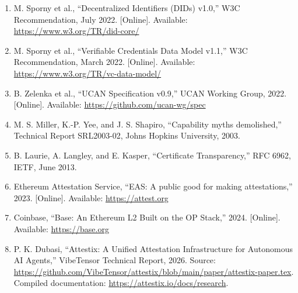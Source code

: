 \begin{enumerate}
\vspace{0.3cm}

\item M. Sporny et al., ``Decentralized Identifiers (DIDs) v1.0,'' W3C Recommendation, July 2022. [Online]. Available: \url{https://www.w3.org/TR/did-core/}

\vspace{0.3cm}

\item M. Sporny et al., ``Verifiable Credentials Data Model v1.1,'' W3C Recommendation, March 2022. [Online]. Available: \url{https://www.w3.org/TR/vc-data-model/}

\vspace{0.3cm}

\item B. Zelenka et al., ``UCAN Specification v0.9,'' UCAN Working Group, 2022. [Online]. Available: \url{https://github.com/ucan-wg/spec}

\vspace{0.3cm}

\item M. S. Miller, K.-P. Yee, and J. S. Shapiro, ``Capability myths demolished,'' Technical Report SRL2003-02, Johns Hopkins University, 2003.

\vspace{0.3cm}

\item B. Laurie, A. Langley, and E. Kasper, ``Certificate Transparency,'' RFC 6962, IETF, June 2013.

\vspace{0.3cm}

\item Ethereum Attestation Service, ``EAS: A public good for making attestations,'' 2023. [Online]. Available: \url{https://attest.org}

\vspace{0.3cm}

\item Coinbase, ``Base: An Ethereum L2 Built on the OP Stack,'' 2024. [Online]. Available: \url{https://base.org}

\vspace{0.3cm}

\item P. K. Dubasi, ``Attestix: A Unified Attestation Infrastructure for Autonomous AI Agents,'' VibeTensor Technical Report, 2026. Source: \url{https://github.com/VibeTensor/attestix/blob/main/paper/attestix-paper.tex}. Compiled documentation: \url{https://attestix.io/docs/research}.


\end{enumerate}
